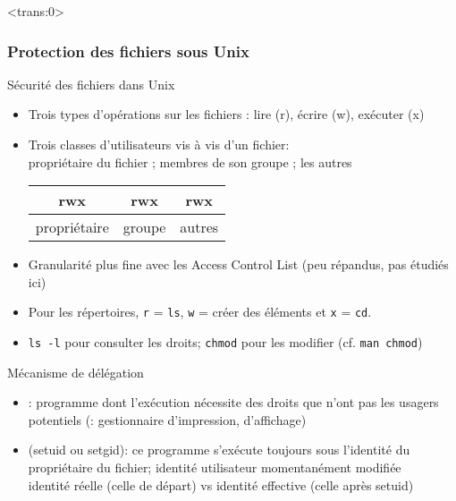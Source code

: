 \begin{frame}<trans:0>\frametitle{Protection des fichiers sous Unix}

\begin{block}{Sécurité des fichiers dans Unix}
    \begin{itemize}
    \item Trois types d'opérations sur les fichiers : lire (r), écrire (w),
      exécuter (x)
    \item Trois classes d'utilisateurs vis à vis d'un fichier:\\
      propriétaire du fichier ; membres de son groupe ; les autres

      \begin{center}        
        \begin{tabular}{|c|c|c|}\hline
          rwx & rwx&rwx\\\hline
          \multicolumn{1}{c}{propriétaire}&
          \multicolumn{1}{c}{groupe}&
          \multicolumn{1}{c}{autres}
        \end{tabular}
      \end{center}
      
    \item[] Granularité plus fine avec les Access Control List {\small (peu
        répandus, pas étudiés ici)}
    \item Pour les répertoires, \texttt{r} = \texttt{ls}, \texttt{w} =
      créer des éléments et \texttt{x} = \texttt{cd}.
    \item \texttt{ls -l} pour consulter les droits; \texttt{chmod} pour les
      modifier  (cf. \texttt{man chmod})
    \end{itemize}
  \end{block}

  \begin{block}{Mécanisme de délégation}
    \begin{itemize}
    \item {} : programme dont l'exécution nécessite des
      droits que n'ont pas les usagers potentiels (:
      gestionnaire d'impression, d'affichage)
    \item {} (\alert{setuid} ou \alert{setgid}): ce
      programme s'exécute toujours sous l'identité du propriétaire du
      fichier; identité utilisateur momentanément modifiée\\
      identité réelle (celle de départ) vs identité effective (celle après
      setuid)
    \end{itemize}
  \end{block}
\end{frame}
